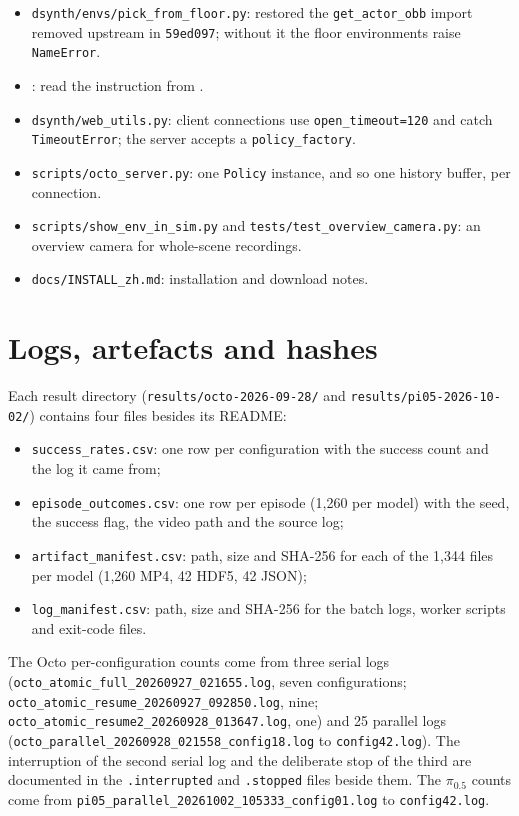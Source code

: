 \begin{itemize}[leftmargin=2em,itemsep=0.15em]
\item \texttt{dsynth/envs/pick\_from\_floor.py}: restored the \texttt{get\_actor\_obb} import removed upstream in \texttt{59ed097}; without it the floor environments raise \texttt{NameError}.
\item {}: read the instruction from .
\item \texttt{dsynth/web\_utils.py}: client connections use \texttt{open\_timeout=120} and catch \texttt{TimeoutError}; the server accepts a \texttt{policy\_factory}.
\item \texttt{scripts/octo\_server.py}: one \texttt{Policy} instance, and so one history buffer, per connection.
\item \texttt{scripts/show\_env\_in\_sim.py} and \texttt{tests/test\_overview\_camera.py}: an overview camera for whole-scene recordings.
\item \texttt{docs/INSTALL\_zh.md}: installation and download notes.
\end{itemize}

\section{Logs, artefacts and hashes}

Each result directory (\texttt{results/octo-2026-09-28/} and \texttt{results/pi05-2026-10-02/}) contains four files besides its README:

\begin{itemize}[leftmargin=2em,itemsep=0.15em]
\item \texttt{success\_rates.csv}: one row per configuration with the success count and the log it came from;
\item \texttt{episode\_outcomes.csv}: one row per episode (1,260 per model) with the seed, the success flag, the video path and the source log;
\item \texttt{artifact\_manifest.csv}: path, size and SHA-256 for each of the 1,344 files per model (1,260 MP4, 42 HDF5, 42 JSON);
\item \texttt{log\_manifest.csv}: path, size and SHA-256 for the batch logs, worker scripts and exit-code files.
\end{itemize}

The Octo per-configuration counts come from three serial logs (\texttt{octo\_atomic\_full\_20260927\_021655.log}, seven configurations; \texttt{octo\_atomic\_resume\_20260927\_092850.log}, nine; \texttt{octo\_atomic\_resume2\_20260928\_013647.log}, one) and 25 parallel logs (\texttt{octo\_parallel\_20260928\_021558\_config18.log} to \texttt{config42.log}). The interruption of the second serial log and the deliberate stop of the third are documented in the \texttt{.interrupted} and \texttt{.stopped} files beside them. The $\pi_{0.5}$ counts come from \texttt{pi05\_parallel\_20261002\_105333\_config01.log} to \texttt{config42.log}.

